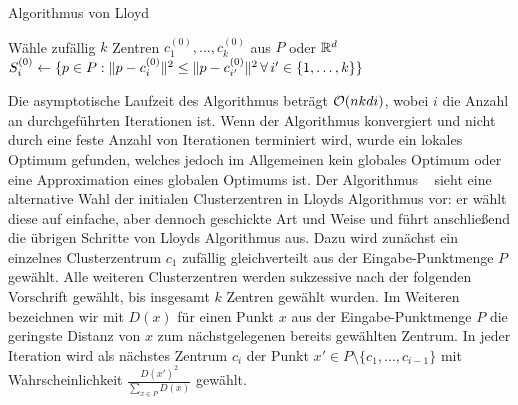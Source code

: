 \begin{algorithm}[H]
\label{algo:lloyd}
\caption{Algorithmus von Lloyd}
	\DontPrintSemicolon
	
	\BlankLine
	
	Wähle zufällig $k$ Zentren $c_1^{(0)}, \dots, c_k^{(0)}$ aus $P$ oder $\mathbb{R}^{d}$\;
	$S_i^{(0)} \leftarrow \{ p \in P : \lVert {p} - {c_i^{(0)}} \rVert^2 \leq \lVert {p} - {c_{i'}^{(0)}} \rVert^2 \, \forall \, i' \in \{ 1, \dots, k \} \}$\;
\end{algorithm}

Die asymptotische Laufzeit des Algorithmus beträgt $\mathcal{O}(nkdi)$, wobei $i$ die Anzahl an durchgeführten Iterationen ist.
Wenn der Algorithmus konvergiert und nicht durch eine feste Anzahl von Iterationen terminiert wird, wurde ein lokales
Optimum gefunden, welches jedoch im Allgemeinen kein globales Optimum oder eine Approximation eines globalen Optimums ist.
\absatz
Der Algorithmus \kmpp~\cite{ArthurV07} sieht eine alternative Wahl der initialen Clusterzentren in Lloyds Algorithmus vor: er
wählt diese auf einfache, aber dennoch geschickte Art und Weise und führt anschließend die übrigen Schritte von Lloyds
Algorithmus aus.
Dazu wird zunächst ein einzelnes Clusterzentrum $c_1$ zufällig gleichverteilt aus der Eingabe-Punktmenge $P$ gewählt.
Alle weiteren Clusterzentren werden sukzessive nach der folgenden Vorschrift gewählt, bis insgesamt $k$ Zentren gewählt wurden.
Im Weiteren bezeichnen wir mit $D(x)$ für einen Punkt $x$ aus der Eingabe-Punktmenge $P$ die geringste Distanz von $x$ zum
nächstgelegenen bereits gewählten Zentrum. In jeder Iteration wird als nächstes Zentrum $c_i$ der Punkt
$x' \in P \setminus \{ c_1, \dots, c_{i-1} \}$ mit Wahrscheinlichkeit $\frac{D(x')^2}{\sum_{x \in P} D(x)}$ gewählt.

